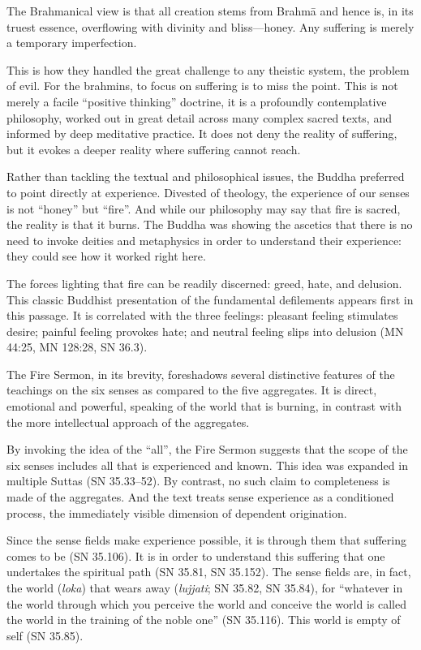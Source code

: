 \documentclass[12pt,openany]{book}%
\begin{document}
The Brahmanical view is that all creation stems from \textsanskrit{Brahmā} and hence is, in its truest essence, overflowing with divinity and bliss—honey. Any suffering is merely a temporary imperfection.

This is how they handled the great challenge to any theistic system, the problem of evil. For the brahmins, to focus on suffering is to miss the point. This is not merely a facile “positive thinking” doctrine, it is a profoundly contemplative philosophy, worked out in great detail across many complex sacred texts, and informed by deep meditative practice. It does not deny the reality of suffering, but it evokes a deeper reality where suffering cannot reach.

Rather than tackling the textual and philosophical issues, the Buddha preferred to point directly at experience. Divested of theology, the experience of our senses is not “honey” but “fire”. And while our philosophy may say that fire is sacred, the reality is that it burns. The Buddha was showing the ascetics that there is no need to invoke deities and metaphysics in order to understand their experience: they could see how it worked right here.

The forces lighting that fire can be readily discerned: greed, hate, and delusion. This classic Buddhist presentation of the fundamental defilements appears first in this passage. It is correlated with the three feelings: pleasant feeling stimulates desire; painful feeling provokes hate; and neutral feeling slips into delusion (MN 44:25, MN 128:28, SN 36.3).

The Fire Sermon, in its brevity, foreshadows several distinctive features of the teachings on the six senses as compared to the five aggregates. It is direct, emotional and powerful, speaking of the world that is burning, in contrast with the more intellectual approach of the aggregates.

By invoking the idea of the “all”, the Fire Sermon suggests that the scope of the six senses includes all that is experienced and known. This idea was expanded in multiple Suttas (SN 35.33–52). By contrast, no such claim to completeness is made of the aggregates. And the text treats sense experience as a conditioned process, the immediately visible dimension of dependent origination.

Since the sense fields make experience possible, it is through them that suffering comes to be (SN 35.106). It is in order to understand this suffering that one undertakes the spiritual path (SN 35.81, SN 35.152). The sense fields are, in fact, the world (\textit{loka}) that wears away (\textit{lujjati}; SN 35.82, SN 35.84), for “whatever in the world through which you perceive the world and conceive the world is called the world in the training of the noble one” (SN 35.116). This world is empty of self (SN 35.85).
\end{document}
